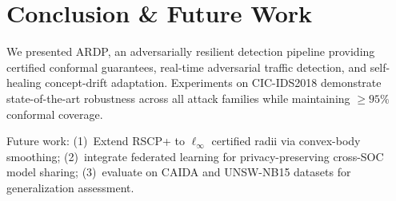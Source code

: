 \documentclass[conference]{IEEEtran}
\begin{document}
\section{Conclusion \& Future Work}
\label{sec:conclusion}

We presented ARDP, an adversarially resilient detection pipeline providing
certified conformal guarantees, real-time adversarial traffic detection,
and self-healing concept-drift adaptation. Experiments on CIC-IDS2018
demonstrate state-of-the-art robustness across all attack families while
maintaining ${\ge}95\%$ conformal coverage.

Future work: (1)~Extend RSCP+ to $\ell_\infty$ certified radii via
convex-body smoothing; (2)~integrate federated learning for privacy-preserving
cross-SOC model sharing; (3)~evaluate on CAIDA and UNSW-NB15 datasets for
generalization assessment.



\end{document}
